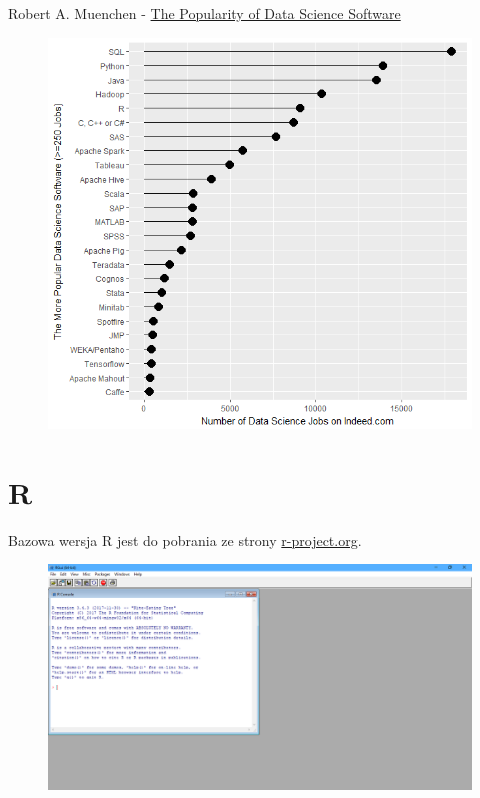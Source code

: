 \documentclass[]{book}
\begin{document}
Robert A. Muenchen - \href{http://r4stats.com/articles/popularity/}{The
Popularity of Data Science Software}

\begin{figure}
\centering
\includegraphics{img/pop_r1.png}
\caption{}
\end{figure}

\section{R}\label{r}

Bazowa wersja R jest do pobrania ze strony
\href{https://cloud.r-project.org/}{r-project.org}.

\begin{figure}
\centering
\includegraphics{img/r.png}
\caption{}
\end{figure}
\end{document}
